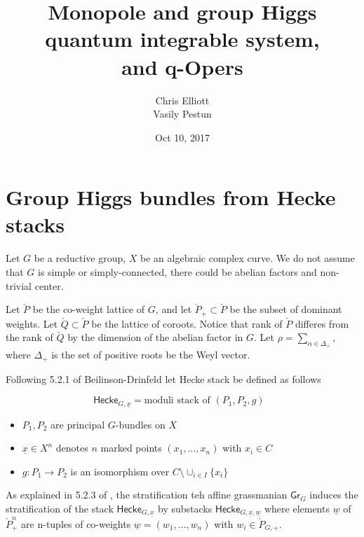 \documentclass[12pt,psamsfonts,reqno]{amsart}
\title{Monopole and group Higgs quantum integrable system, \\
    and q-Opers}
\author{ Chris Elliott \\ Vasily Pestun}
\date{Oct 10, 2017}
\begin{document}
\maketitle

\newcommand{\GrHiggs}{\mathsf{GrHiggs}}
\newcommand{\Bun}{\mathsf{Bun}}
\newcommand{\Mon}{\mathsf{Mon}}


\newcommand{\Hecke}{\mathsf{Hecke}}

\section{Group Higgs bundles from Hecke stacks}
\label{se:grhiggs}
\newcommand{\sn}{\mathsf{n}}
\newcommand{\fr}{\mathrm{fr}}
Let $G$ be a reductive group, $X$ be an algebraic complex curve. We do not assume
that $G$ is simple or simply-connected, there could be abelian factors and non-trivial
center. 

Let $\check P$ be the co-weight lattice of $G$, and let
$\check P_{+} \subset \check P$ be the subset of dominant weights.
Let $\check Q \subset \check P$ be the lattice of coroots. Notice
that rank of $\check P$ differes from the rank of $\check Q$ by
the dimension of the abelian factor in $G$. 
Let $\rho = \sum_{\alpha \in \Delta_{+}}$, where $\Delta_{+}$ is the set of
positive roots be the Weyl vector. 


Following 5.2.1 of Beilinson-Drinfeld \cite{Beilinson:Drinfeld}
let Hecke stack be defined as follows

\begin{definition}
\begin{equation}
  \Hecke_{G, \underline{x}} = \text{moduli stack of  $(P_1, P_2 , g)$ }
\end{equation}
\begin{itemize}
\item $P_1, P_2$ are principal $G$-bundles on $X$
\item $\underline{x} \in X^n$ denotes $n$ marked points $(x_1, \dots, x_n)$ with $x_i \in C$
\item $g: P_{1} \to P_{2}$ is an isomorphism over $C \setminus \cup_{i \in I} \{ x_i \}$ 
\end{itemize}
\end{definition}
As explained
in 5.2.3 of  \cite{Beilinson:Drinfeld}, the stratification teh affine grassmanian
$\mathsf{Gr}_{G}$ induces the stratification of the stack $\Hecke_{G,\underline{x}}$ by
substacks $\Hecke_{G,\underline{x}, \underline{w}}$ where elements $\underline{w}$ of $\check P_{+}^{n}$
  are n-tuples of co-weights $\underline{w} = (w_1, \dots, w_n)$ with $w_i \in \check P_{G,+}$. 
\end{document}
